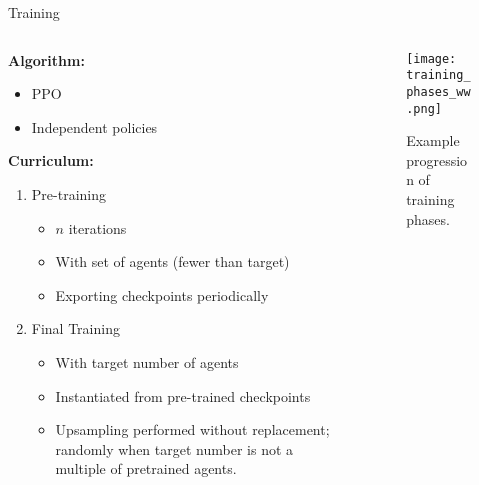 \begin{frame}{Training}
    \begin{columns}
        \begin{column}{0.6\textwidth}
            
            \textbf{Algorithm:}
            \begin{itemize}
                \item PPO
                \item Independent policies
            \end{itemize}
        
            \textbf{Curriculum:}
            \begin{enumerate}
                \item Pre-training
                \begin{itemize}
                    \item $n$ iterations
                    \item With set of agents (fewer than target)
                    \item Exporting checkpoints periodically
                \end{itemize}
                \item Final Training
                \begin{itemize}
                    \item With target number of agents
                    \item Instantiated from pre-trained checkpoints
                    \item Upsampling performed without replacement; 
                        randomly when target number is not a multiple of pretrained agents.
                \end{itemize}
            \end{enumerate}
        \end{column}
        \begin{column}{0.4\textwidth}
            \begin{figure}
                \centering
                \texttt{[image: training\_phases\_ww.png]}
                \caption{Example progression of training phases.}
            \end{figure}
        \end{column}
    \end{columns}
\end{frame}

